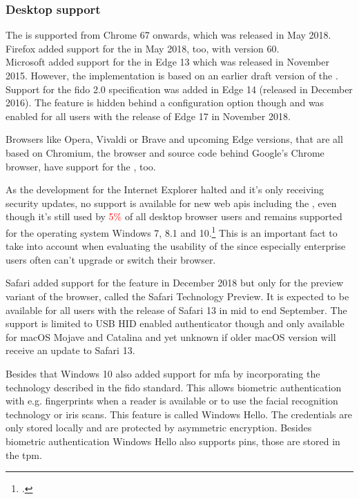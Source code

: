 \newpage

\subsubsection{Desktop support}

The \wa{} is supported from Chrome 67 onwards, which was released in May 2018. Firefox added support for the \wa{} in May 2018, too, with version 60.\\
Microsoft added support for the \wa{} in Edge 13 which was released in November 2015. However, the implementation is based on an earlier draft version of the \wa. Support for the \gls{fido} 2.0 specification was added in Edge 14 (released in December 2016). The feature is hidden behind a configuration option though and was enabled for all users with the release of Edge 17 in November 2018.

Browsers like Opera, Vivaldi or Brave and upcoming Edge versions, that are all based on Chromium, the browser and source code behind Google's Chrome browser, have support for the \wa, too.

As the development for the Internet Explorer halted and it's only receiving security updates, no support is available for new web \glspl{api} including the \wa, even though it's still used by \textcolor{red}{5\%} of all desktop browser users and remains supported for the operating system Windows 7, 8.1 and 10.\footcite[See][]{ie-support}
 This is an important fact to take into account when evaluating the usability of the \wa{} since especially enterprise users often can't upgrade or switch their browser.

Safari added support for the \wa{} feature in December 2018 but only for the preview variant of the browser, called the Safari Technology Preview. It is expected to be available for all users with the release of Safari 13 in mid to end September. The support is limited to USB HID enabled authenticator though and only available for macOS Mojave and Catalina and yet unknown if older macOS version will receive an update to Safari 13.

Besides that Windows 10 also added support for \gls{mfa} by incorporating the technology described in the \gls{fido} standard. This allows biometric authentication with e.g. fingerprints when a reader is available or to use the facial recognition technology or iris scans. This feature is called \frqq Windows Hello\flqq{}. The credentials are only stored locally and are protected by asymmetric encryption. Besides biometric authentication Windows Hello also supports \glspl{pin}, those are stored in the \gls{tpm}.

